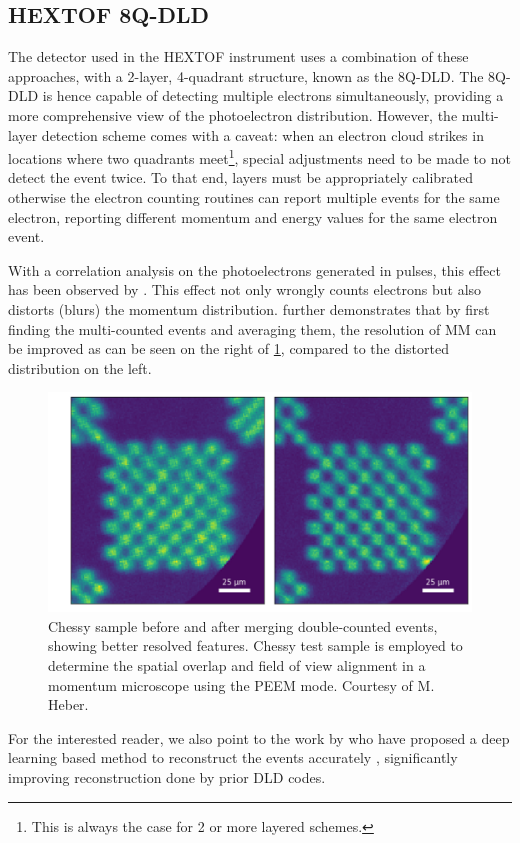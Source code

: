 \subsection*{HEXTOF 8Q-DLD}
The detector used in the \gls{HEXTOF} instrument uses a combination of these approaches, with a 2-layer, 4-quadrant structure, known as the 8Q-DLD. The 8Q-DLD is hence capable of detecting multiple electrons simultaneously, providing a more comprehensive view of the photoelectron distribution. However, the multi-layer detection scheme comes with a caveat: when an electron cloud strikes in locations where two quadrants meet\footnote{This is always the case for 2 or more layered schemes.}, special adjustments need to be made to not detect the event twice. To that end, layers must be appropriately calibrated otherwise the electron counting routines can report multiple events for the same electron, reporting different momentum and energy values for the same electron event. 

With a correlation analysis on the photoelectrons generated in pulses, this effect has been observed by \citeauthor{heberStudiesUltrafastDynamics2024} \cite{heberStudiesUltrafastDynamics2024}. This effect not only wrongly counts electrons but also distorts (blurs) the momentum distribution. \citeauthor{heberStudiesUltrafastDynamics2024} further demonstrates that by first finding the multi-counted events and averaging them, the resolution of \gls{MM} can be improved as can be seen on the right of \cref{fig:chessy-distribution}, compared to the distorted distribution on the left.

\begin{figure}
    \centering
    \includegraphics[width=0.7\linewidth]{images/chessy_deblurring_merged_events.png}
    \caption{Chessy sample before and after merging double-counted events, showing better resolved features. Chessy test sample is employed to determine the spatial overlap and field of view alignment in a momentum microscope using the \gls{PEEM} mode. Courtesy of M. Heber.}
    \label{fig:chessy-distribution}
\end{figure}

For the interested reader, we also point to the work by \citeauthor{knipferDeepLearningbasedSpatiotemporal2024} who have proposed a deep learning based method to reconstruct the events accurately \cite{knipferDeepLearningbasedSpatiotemporal2024}, significantly improving reconstruction done by prior \gls{DLD} codes.